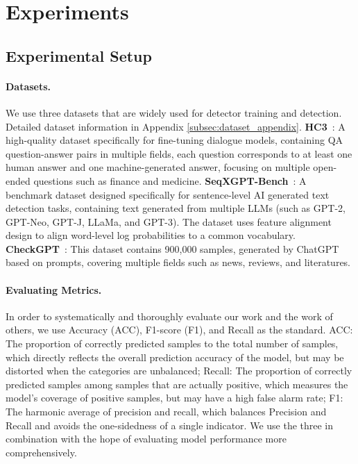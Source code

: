 \documentclass[11pt]{article}
\newcommand{\greenCitep}[1]{\textcolor{darkgreen}{\citep{#1}}}
\begin{document}
	\section{Experiments}
	\subsection{Experimental Setup}
	\label{sec:experimental_setup}
	\paragraph{Datasets.} 
	 We use three datasets that are widely used for detector training and detection. Detailed dataset information in Appendix \ref{subsec:dataset_appendix}. \textbf{HC3}~\greenCitep{guo2023simpleai}: A high-quality dataset specifically for fine-tuning dialogue models, containing QA question-answer pairs in multiple fields, each question corresponds to at least one human answer and one machine-generated answer, focusing on multiple open-ended questions such as finance and medicine. \textbf{SeqXGPT-Bench}~\greenCitep{wang2023seqxgpt}: A benchmark dataset designed specifically for sentence-level AI generated text detection tasks, containing text generated from multiple LLMs (such as GPT-2, GPT-Neo, GPT-J, LLaMa, and GPT-3). The dataset uses feature alignment design to align word-level log probabilities to a common vocabulary. \textbf{CheckGPT}~\greenCitep{liu2024checkgpt}: This dataset contains 900,000 samples, generated by ChatGPT based on prompts, covering multiple fields such as news, reviews, and literatures.

	\paragraph{Evaluating Metrics.}
	In order to systematically and thoroughly evaluate our work and the work of others, we use Accuracy (ACC), F1-score (F1), and Recall as the standard. ACC: The proportion of correctly predicted samples to the total number of samples, which directly reflects the overall prediction accuracy of the model, but may be distorted when the categories are unbalanced; Recall: The proportion of correctly predicted samples among samples that are actually positive, which measures the model's coverage of positive samples, but may have a high false alarm rate; F1: The harmonic average of precision and recall, which balances Precision and Recall and avoids the one-sidedness of a single indicator. We use the three in combination with the hope of evaluating model performance more comprehensively.
	
\end{document}
